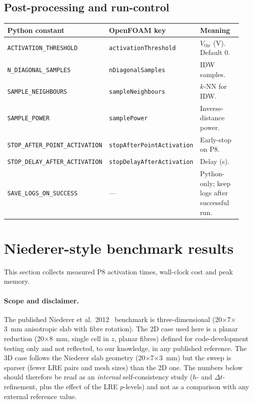\documentclass[11pt,a4paper]{article}
\newcommand{\code}[1]{\texttt{\small #1}}
\begin{document}
\subsection{Post-processing and run-control}
\begin{longtable}{@{}p{0.35\linewidth}p{0.30\linewidth}p{0.30\linewidth}@{}}
\toprule
Python constant & OpenFOAM key & Meaning \\
\midrule \endhead
\code{ACTIVATION\_THRESHOLD} & \code{activationThreshold} &
   $V_{\text{thr}}$ (V). Default $0$. \\
\code{N\_DIAGONAL\_SAMPLES} & \code{nDiagonalSamples} & IDW samples. \\
\code{SAMPLE\_NEIGHBOURS} & \code{sampleNeighbours} & $k$-NN for IDW. \\
\code{SAMPLE\_POWER} & \code{samplePower} & Inverse-distance power. \\
\code{STOP\_AFTER\_POINT\_ACTIVATION} &
   \code{stopAfterPointActivation} & Early-stop on P8. \\
\code{STOP\_DELAY\_AFTER\_ACTIVATION} &
   \code{stopDelayAfterActivation} & Delay (s). \\
\code{SAVE\_LOGS\_ON\_SUCCESS} & --- &
   Python-only; keep logs after successful run. \\
\bottomrule
\end{longtable}

\section{Niederer-style benchmark results}
\label{sec:results}

This section collects measured P8 activation times, wall-clock cost
and peak memory.

\paragraph{Scope and disclaimer.}
The published Niederer et al.~2012~\cite{niederer2012} benchmark is
three-dimensional (20$\times$7$\times$3~mm anisotropic slab with
fibre rotation). The 2D case used here is a planar reduction
(20$\times$8~mm, single cell in $z$, planar fibres) defined for
code-development testing only and not reflected, to our knowledge,
in any published reference. The 3D case follows the Niederer slab
geometry (20$\times$7$\times$3~mm) but the sweep is sparser (fewer
LRE pairs and mesh sizes) than the 2D one. The numbers below should
therefore be read as an \emph{internal} self-consistency study
($h$- and $\Delta t$-refinement, plus the effect of the LRE
$p$-levels) and not as a comparison with any external reference
value.
\end{document}
